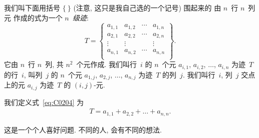 \begin{definition}
    我们叫下面用括号 \(\{ \ \}\)
    (注意, 这只是我自己选的一个记号)
    围起来的%
    由 \(n\)~行 \(n\)~列元%
    作成的式为一个 \emph{\(n\)~级迹}:
    \begin{equation}
        T =
        \begin{Bmatrix}
            a_{1,1} & a_{1,2} & \cdots & a_{1,n} \\
            a_{2,1} & a_{2,2} & \cdots & a_{2,n} \\
            \vdots  & \vdots  & {}     & \vdots  \\
            a_{n,1} & a_{n,2} & \cdots & a_{n,n} \\
        \end{Bmatrix}.
        \label{eq:C0204}
    \end{equation}
    它由 \(n\)~行 \(n\)~列, 共 \(n^2\)~个元作成.
    我们叫行~\(i\) 的 \(n\)~个元
    \(a_{i,1}\), \(a_{i,2}\), \(\dots\), \(a_{i,n}\)
    为迹~\(T\) 的行~\(i\),
    叫列~\(j\) 的 \(n\)~个元
    \(a_{1,j}\), \(a_{2,j}\), \(\dots\), \(a_{n,j}\)
    为迹~\(T\) 的列~\(j\).
    我们叫行~\(i\), 列~\(j\) 交点上的元 \(a_{i,j}\)
    为迹~\(T\) 的 \((i,j)\)-元.

    我们定义式~\eqref{eq:C0204} 为
    \begin{align*}
        T = a_{1,1} + a_{2,2} + \dots + a_{n,n}.
    \end{align*}
\end{definition}

这是一个个人喜好问题.
不同的人, 会有不同的想法.
